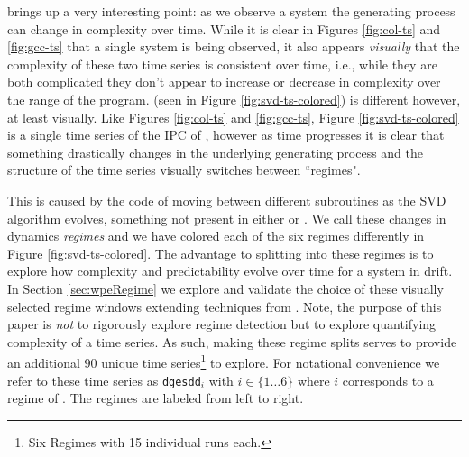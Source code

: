 \svd brings up a very interesting point: as we observe a system the generating process can change in complexity over time. While it is clear in Figures \ref{fig:col-ts} and \ref{fig:gcc-ts} that a single system is being observed, it also appears \emph{visually} that the complexity of these two time series is consistent over time, i.e., while they are both complicated they don't appear to increase or decrease in complexity over the range of the program. \svd (seen in Figure \ref{fig:svd-ts-colored}) is different however, at least visually. Like Figures \ref{fig:col-ts} and \ref{fig:gcc-ts}, Figure \ref{fig:svd-ts-colored} is a single time series of the IPC of \svd, however as time progresses it is clear that something drastically changes in the underlying generating process and the structure of the time series  visually switches between ``regimes".

This is caused by the code of \svd moving between different subroutines as the SVD algorithm evolves, something not present in either \gcc or \col. We call these changes in \svd dynamics \emph{\svd regimes} and we have colored each of the six regimes differently in Figure \ref{fig:svd-ts-colored}. The advantage to splitting \svd into these regimes is to explore how complexity and predictability evolve over time for a system in drift. In Section \ref{sec:wpeRegime} we explore and validate the choice of these visually selected regime windows extending techniques from \cite{cao2004det}. Note, the purpose of this paper is \emph{not} to rigorously explore regime detection but to explore quantifying complexity of a time series. As such, making these regime splits serves to provide an additional 90 unique time series\footnote{Six Regimes with 15 individual runs each.} to explore. For notational convenience we refer to these time series as {\tt dgesdd$_i$} with $i \in \{1\dots6\}$ where $i$ corresponds to a regime of \svd. The regimes are labeled from left to right. 



 
